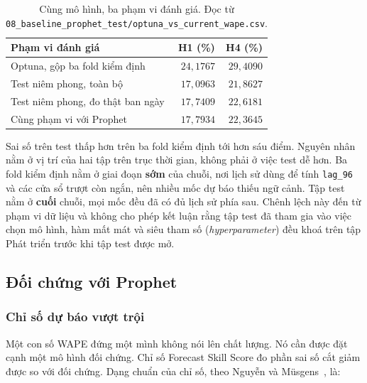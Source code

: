 \documentclass[12pt, a4paper]{report}
\begin{document}
\begin{table}[htbp]
\centering
\caption{Cùng mô hình, ba phạm vi đánh giá. Đọc từ
\texttt{08\_baseline\_prophet\_test/optuna\_vs\_current\_wape.csv}.}
\label{tab:ba_pham_vi}
\small
\begin{tabular}{l r r}
\toprule
\textbf{Phạm vi đánh giá} & \textbf{H1 (\%)} & \textbf{H4 (\%)} \\
\midrule
Optuna, gộp ba fold kiểm định   & $24{,}1767$ & $29{,}4090$ \\
Test niêm phong, toàn bộ        & $17{,}0963$ & $21{,}8627$ \\
Test niêm phong, đo thật ban ngày & $17{,}7409$ & $22{,}6181$ \\
Cùng phạm vi với Prophet        & $17{,}7934$ & $22{,}3645$ \\
\bottomrule
\end{tabular}
\caption[Cùng mô hình, ba phạm vi đánh giá]{Cùng mô hình, ba phạm vi đánh giá. Đọc từ
\texttt{08\_baseline\_prophet\_test/optuna\_vs\_current\_wape.csv}.}
\label{tab:ba_pham_vi}
\end{table}

Sai số trên test thấp hơn trên ba fold kiểm định tới hơn sáu điểm. Nguyên nhân nằm ở vị trí của
hai tập trên trục thời gian, không phải ở việc test dễ hơn. Ba fold kiểm định nằm ở giai đoạn
\textbf{sớm} của chuỗi, nơi lịch sử dùng để tính \texttt{lag\_96} và các cửa sổ trượt còn ngắn, nên
nhiều mốc dự báo thiếu ngữ cảnh. Tập test nằm ở \textbf{cuối} chuỗi, mọi mốc đều đã có đủ lịch
sử phía sau. Chênh lệch này đến từ phạm vi dữ liệu và không cho phép kết luận rằng tập test đã
tham gia vào việc chọn mô hình, hàm mất mát và siêu tham số (\textit{hyperparameter}) đều khoá trên tập Phát triển
trước khi tập test được mở.

\FloatBarrier
\subsection{Đối chứng với Prophet}

\subsubsection{Chỉ số dự báo vượt trội}

Một con số WAPE đứng một mình không nói lên chất lượng. Nó cần được đặt cạnh một mô hình đối
chứng. Chỉ số Forecast Skill Score đo phần sai số cắt giảm được so với đối chứng. Dạng chuẩn của
chỉ số, theo Nguyễn và Müsgens~\cite{nguyen2026meta}, là:
\end{document}
